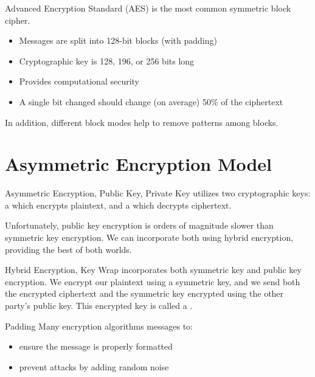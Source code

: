 \documentclass[code]{amznotes}
\begin{document}
\begin{dfnbox}{Advanced Encryption Standard (AES)}{}
     is the most common symmetric block cipher.
    \begin{itemize}[noitemsep]
        \item Messages are split into 128-bit blocks (with padding)
        \item Cryptographic key is 128, 196, or 256 bits long
        \item Provides computational security
        \item A single bit changed should change (on average) 50\% of the ciphertext
    \end{itemize}
    In addition, different block modes help to remove patterns among blocks.
\end{dfnbox}

\section{Asymmetric Encryption Model}

\begin{dfnbox}{Asymmetric Encryption, Public Key, Private Key}{}
     utilizes two cryptographic keys: a  which encrypts plaintext, and a  which decrypts ciphertext.
\end{dfnbox}

Unfortunately, public key encryption is orders of magnitude slower than symmetric key encryption. We can incorporate both using hybrid encryption, providing the best of both worlds.

\begin{dfnbox}{Hybrid Encryption, Key Wrap}{}
     incorporates both symmetric key and public key encryption. We encrypt our plaintext using a symmetric key, and we send both the encrypted ciphertext and the symmetric key encrypted using the other party's public key. This encrypted key is called a .
\end{dfnbox}

\begin{dfnbox}{Padding}{}
    Many encryption algorithms  messages to:
    \begin{itemize}[noitemsep]
        \item ensure the message is properly formatted
        \item prevent attacks by adding random noise
    \end{itemize}
\end{dfnbox}
\end{document}
